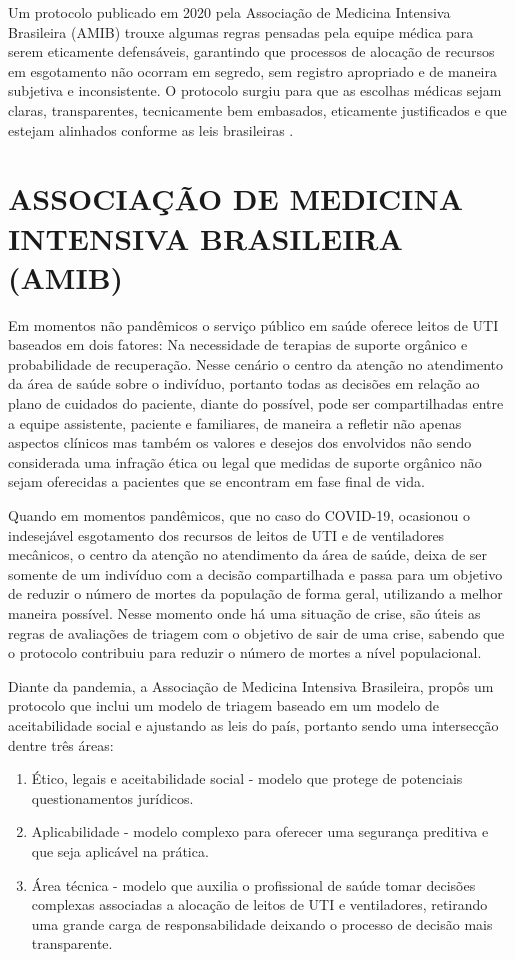 \documentclass[12pt]{article}
\begin{document}
Um protocolo publicado em 2020 pela Associação de Medicina Intensiva Brasileira (AMIB) trouxe algumas regras pensadas pela equipe médica para serem eticamente defensáveis, garantindo que processos de alocação de recursos em esgotamento não ocorram em segredo, sem registro apropriado e de maneira subjetiva e inconsistente. O protocolo surgiu para que as escolhas médicas sejam claras, transparentes, tecnicamente bem embasados, eticamente justificados e que estejam alinhados conforme as leis brasileiras \cite{kretzer2020protocolo}.

\section{ASSOCIAÇÃO DE MEDICINA INTENSIVA BRASILEIRA (AMIB)}

Em momentos não pandêmicos o serviço público em saúde oferece leitos de UTI baseados em dois fatores: Na necessidade de terapias de suporte orgânico e probabilidade de recuperação. Nesse cenário o centro da atenção no atendimento da área de saúde sobre o indivíduo, portanto todas as decisões em relação ao plano de cuidados do paciente, diante do possível, pode ser compartilhadas entre a equipe assistente, paciente e familiares, de maneira a refletir não apenas aspectos clínicos mas também os valores e desejos dos envolvidos não sendo considerada uma infração ética ou legal que medidas de suporte orgânico não sejam oferecidas a pacientes que se encontram em fase final de vida. 

Quando em momentos pandêmicos, que no caso do COVID-19, ocasionou o indesejável esgotamento dos recursos de leitos de UTI e de ventiladores mecânicos, o centro da atenção no atendimento da área de saúde, deixa de ser somente de um indivíduo com a decisão compartilhada e passa para um objetivo de reduzir o número de mortes da população de forma geral, utilizando a melhor maneira possível. Nesse momento onde há uma situação de crise, são úteis as regras de avaliações de triagem com o objetivo de sair de uma crise, sabendo que o protocolo contribuiu para reduzir o número de mortes a nível populacional.

Diante da pandemia, a Associação de Medicina Intensiva Brasileira, propôs um protocolo que inclui um modelo de triagem baseado em um modelo de aceitabilidade social \cite{biddison2019too} e ajustando as leis do país, portanto sendo uma intersecção dentre três áreas: 
\begin{enumerate}
    \item  Ético, legais e aceitabilidade social - modelo que protege de potenciais questionamentos jurídicos.
    \item Aplicabilidade - modelo complexo para oferecer uma segurança preditiva e que seja aplicável na prática.
    \item Área técnica - modelo que auxilia o profissional de saúde tomar decisões complexas associadas a alocação de leitos de UTI e ventiladores, retirando uma grande carga de responsabilidade deixando o processo de decisão mais transparente.
\end{enumerate}
\end{document}
